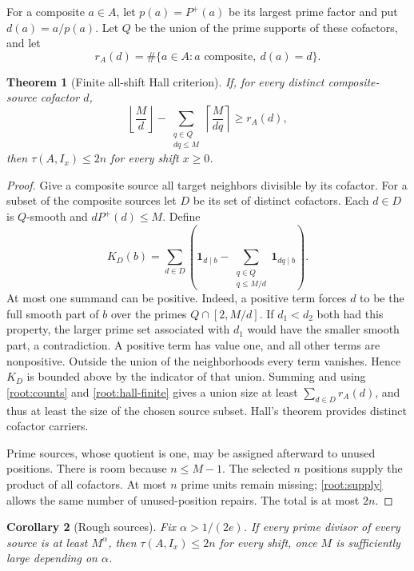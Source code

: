 \documentclass[11pt,a4paper]{article}
\newtheorem{theorem}{Theorem}[section]
\newtheorem{corollary}[theorem]{Corollary}
\theoremstyle{remark}
\begin{document}
For a composite \(a\in A\), let \(p(a)=P^+(a)\) be its largest
prime factor and put \(d(a)=a/p(a)\). Let \(Q\) be the union of the
prime supports of these cofactors, and let
\[
 r_A(d)=\#\{a\in A:a\text{ composite},\ d(a)=d\}.
\]

\begin{theorem}[Finite all-shift Hall criterion]
\label{root:hall-theorem}
If, for every distinct composite-source cofactor \(d\),
\begin{equation}
 \left\lfloor\frac Md\right\rfloor
 -\sum_{\substack{q\in Q\\dq\le M}}
       \left\lceil\frac M{dq}\right\rceil
 \ge r_A(d),
 \label{root:hall-finite}
\end{equation}
then \(\tau(A,I_x)\le2n\) for every shift \(x\ge0\).
\end{theorem}

\begin{proof}
Give a composite source all target neighbors divisible by its
cofactor. For a subset of the composite sources let \(D\) be its set
of distinct cofactors. Each \(d\in D\) is \(Q\)-smooth and
\(dP^+(d)\le M\). Define
\[
 K_D(b)=\sum_{d\in D}
 \left(\mathbf1_{d\mid b}
       -\sum_{\substack{q\in Q\\q\le M/d}}
            \mathbf1_{dq\mid b}\right).
\]
At most one summand can be positive. Indeed, a positive term forces
\(d\) to be the full smooth part of \(b\) over the primes
\(Q\cap[2,M/d]\). If \(d_1<d_2\) both had this property, the larger
prime set associated with \(d_1\) would have the smaller smooth part,
a contradiction. A positive term has value one, and all other terms
are nonpositive. Outside the union of the neighborhoods every term
vanishes. Hence \(K_D\) is bounded above by the indicator of that
union. Summing and using \eqref{root:counts} and
\eqref{root:hall-finite} gives a union size at least
\(\sum_{d\in D}r_A(d)\), and thus at least the size of the chosen
source subset. Hall's theorem provides distinct cofactor carriers.

Prime sources, whose quotient is one, may be assigned afterward to
unused positions. There is room because \(n\le M-1\). The selected
\(n\) positions supply the product of all cofactors. At most \(n\)
prime units remain missing; \eqref{root:supply} allows the same
number of unused-position repairs. The total is at most \(2n\).
\end{proof}

\begin{corollary}[Rough sources]
\label{root:rough}
Fix \(\alpha>1/(2e)\). If every prime divisor of every source is at
least \(M^\alpha\), then \(\tau(A,I_x)\le2n\) for every shift, once
\(M\) is sufficiently large depending on \(\alpha\).
\end{corollary}
\end{document}
